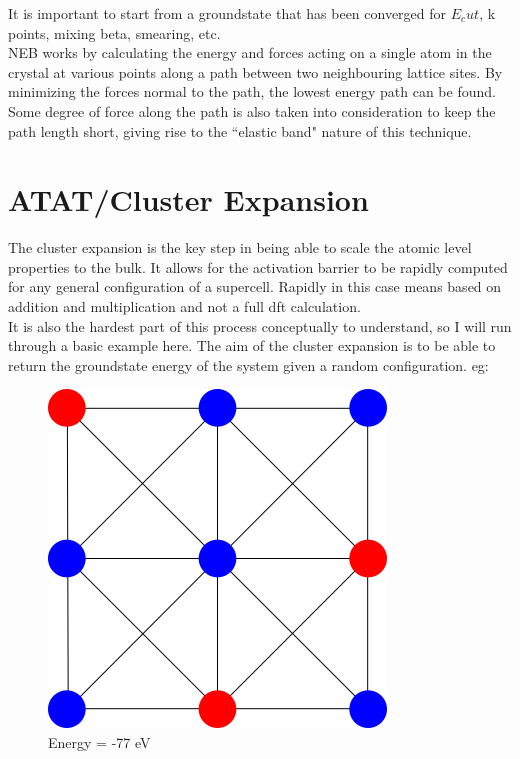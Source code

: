 \documentclass[12pt]{article}
\begin{document}
It is important to start from a groundstate that has been converged for $E_cut$, k points, mixing beta, smearing, etc.  \\

NEB works by calculating the energy and forces acting on a single atom in the crystal at various points along a path between two neighbouring lattice sites. By minimizing the forces normal to the path, the lowest energy path can be found.  Some degree of force along the path is also taken into consideration to keep the path length short, giving rise to the ``elastic band" nature of this technique.   

\section{ATAT/Cluster Expansion}

The cluster expansion is the key step in being able to scale the atomic level properties to the bulk.  It allows for the activation barrier to be rapidly computed for any general configuration of a supercell.  Rapidly in this case means based on addition and multiplication and not a full dft calculation.  \\

It is also the hardest part of this process conceptually to understand, so I will run through a basic example here. The aim of the cluster expansion is to be able to return the groundstate energy of the system given a random configuration.  eg:\\
\begin{figure}[H]
	\centering
\includegraphics[scale=0.5]{./images/config.png}
\caption*{Energy = -77 eV}
\end{figure}
\end{document}
